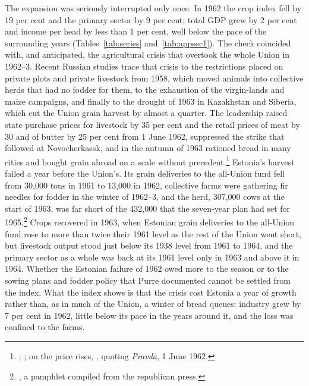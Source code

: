 The expansion was seriously interrupted only once. In 1962 the crop index fell by 19 per cent and the primary sector by 9 per cent; total GDP grew by 2 per cent and income per head by less than 1 per cent, well below the pace of the surrounding years (Tables~\ref{tab:series} and~\ref{tab:appsec1}). The check coincided with, and anticipated, the agricultural crisis that overtook the whole Union in 1962--3. Recent Russian studies trace that crisis to the restrictions placed on private plots and private livestock from 1958, which moved animals into collective herds that had no fodder for them, to the exhaustion of the virgin-lands and maize campaigns, and finally to the drought of 1963 in Kazakhstan and Siberia, which cut the Union grain harvest by almost a quarter. The leadership raised state purchase prices for livestock by 35 per cent and the retail prices of meat by 30 and of butter by 25 per cent from 1 June 1962, suppressed the strike that followed at Novocherkassk, and in the autumn of 1963 rationed bread in many cities and bought grain abroad on a scale without precedent.\footnote{\autocite[17--19]{belkharoev2024}; \autocite[111--13]{andreenkov2021}; on the price rises, \autocite[54]{purre1964}, quoting \textit{Pravda}, 1 June 1962.} Estonia's harvest failed a year before the Union's. Its grain deliveries to the all-Union fund fell from 30,000 tons in 1961 to 13,000 in 1962, collective farms were gathering fir needles for fodder in the winter of 1962--3, and the herd, 307,000 cows at the start of 1963, was far short of the 432,000 that the seven-year plan had set for 1965.\footnote{\autocite[34--5, 55]{purre1964}, a pamphlet compiled from the republican press.} Crops recovered in 1963, when Estonian grain deliveries to the all-Union fund rose to more than twice their 1961 level as the rest of the Union went short, but livestock output stood just below its 1938 level from 1961 to 1964, and the primary sector as a whole was back at its 1961 level only in 1963 and above it in 1964. Whether the Estonian failure of 1962 owed more to the season or to the sowing plans and fodder policy that Purre documented cannot be settled from the index. What the index shows is that the crisis cost Estonia a year of growth rather than, as in much of the Union, a winter of bread queues: industry grew by 7 per cent in 1962, little below its pace in the years around it, and the loss was confined to the farms.

